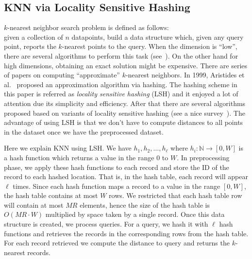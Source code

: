 \subsection{KNN via Locality Sensitive Hashing}
$k$-nearest neighbor search problem is defined as follows:\\
given a collection of $n$ datapoints, build a data structure which, given any query point, reports the $k$-nearest points to the query. 
When the dimension is ``low'', there are several algorithms to perform this task (see~\cite{samet2006foundations}). 
On the other hand for high dimensions, obtaining an exact solution might be expensive. 
There are series of papers on computing ``approximate'' $k$-nearest neighbors. 
In 1999, Aristides et al.~\cite{gionis1999similarity} proposed an approximation algorithm via hashing.
The hashing scheme in this paper is referred as \emph{locality sensitive hashing} (LSH) and it enjoyed a lot of attention due its simplicity and efficiency. 
After that there are several algorithms proposed based on variants of locality sensitive hashing (see a nice survey~\cite{andoni2006near}).
The advantage of using LSH is that we don't have to compute distances to all points in the dataset once we have the preprocessed dataset. 

Here we explain KNN using LSH. 
We have $h_1, h_2, \ldots, h_\ell$ where $h_i: \mathbb{N} \to [0, W]$ is a hash function which returns a value in the range $0$ to $W$.
In preprocessing phase, we apply these hash functions to each record and store the ID of the record to each hashed location. 
That is, in the hash table, each record will appear $\ell$ times. 
Since each hash function maps a record to a value in the range $[0, W]$, the hash table contains at most $W$ rows. 
We restricted that each hash table row will contain at most $MR$ elements, hence the size of the hash table is $O(MR \cdot W)$ multiplied by space taken by a single record. 
Once this data structure is created, we process queries. 
For a query, we hash it with $\ell$ hash functions and retrieves the records in the corresponding rows from the hash table. 
For each record retrieved we compute the distance to query and returns the $k$-nearest records. 


